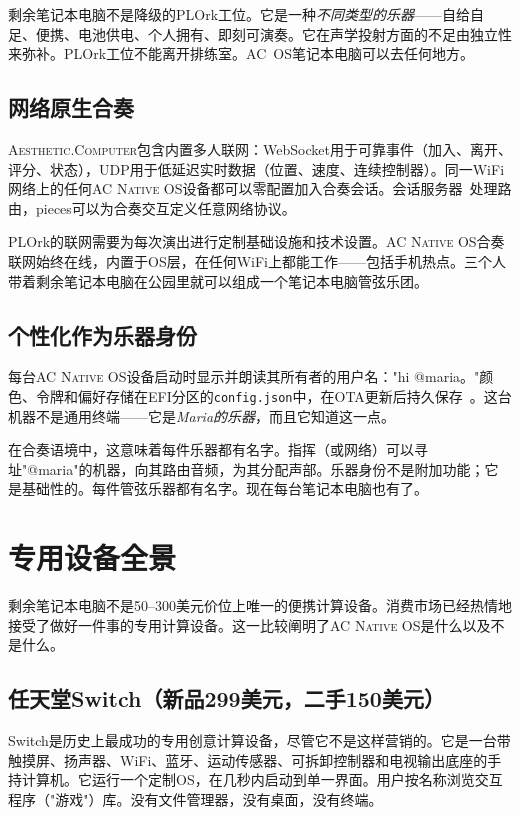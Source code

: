 \documentclass[10pt,letterpaper,twocolumn]{article}
\newcommand{\ac}{\textsc{Aesthetic.Computer}}
\newcommand{\acos}{\textsc{AC Native OS}}
\begin{document}
剩余笔记本电脑不是降级的PLOrk工位。它是一种\emph{不同类型的乐器}——自给自足、便携、电池供电、个人拥有、即刻可演奏。它在声学投射方面的不足由独立性来弥补。PLOrk工位不能离开排练室。AC~OS笔记本电脑可以去任何地方。

\subsection{网络原生合奏}

\ac{}包含内置多人联网：WebSocket用于可靠事件（加入、离开、评分、状态），UDP用于低延迟实时数据（位置、速度、连续控制器）。同一WiFi网络上的任何\acos{}设备都可以零配置加入合奏会话。会话服务器~\citep{scudder2026ac}处理路由，pieces可以为合奏交互定义任意网络协议。

PLOrk的联网需要为每次演出进行定制基础设施和技术设置。\acos{}合奏联网始终在线，内置于OS层，在任何WiFi上都能工作——包括手机热点。三个人带着剩余笔记本电脑在公园里就可以组成一个笔记本电脑管弦乐团。

\subsection{个性化作为乐器身份}

每台\acos{}设备启动时显示并朗读其所有者的用户名："hi @maria。"颜色、令牌和偏好存储在EFI分区的\texttt{config.json}中，在OTA更新后持久保存~\citep{scudder2026os}。这台机器不是通用终端——它是\emph{Maria的乐器}，而且它知道这一点。

在合奏语境中，这意味着每件乐器都有名字。指挥（或网络）可以寻址"@maria"的机器，向其路由音频，为其分配声部。乐器身份不是附加功能；它是基础性的。每件管弦乐器都有名字。现在每台笔记本电脑也有了。


\section{专用设备全景}
\label{sec:devices}

剩余笔记本电脑不是50--300美元价位上唯一的便携计算设备。消费市场已经热情地接受了做好一件事的专用计算设备。这一比较阐明了\acos{}是什么以及不是什么。

\subsection{任天堂Switch（新品299美元，二手150美元）}

Switch是历史上最成功的专用创意计算设备，尽管它不是这样营销的。它是一台带触摸屏、扬声器、WiFi、蓝牙、运动传感器、可拆卸控制器和电视输出底座的手持计算机。它运行一个定制OS，在几秒内启动到单一界面。用户按名称浏览交互程序（"游戏"）库。没有文件管理器，没有桌面，没有终端。
\end{document}

